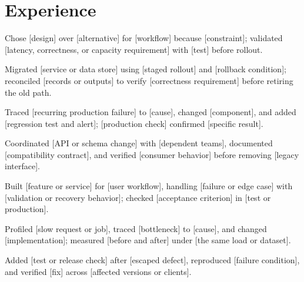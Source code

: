 \documentclass{resume}
\begin{document}

\section{Experience}

\begin{jobduties}
  \item Chose [design] over [alternative] for [workflow] because [constraint]; validated [latency, correctness, or capacity requirement] with [test] before rollout.
  \item Migrated [service or data store] using [staged rollout] and [rollback condition]; reconciled [records or outputs] to verify [correctness requirement] before retiring the old path.
  \item Traced [recurring production failure] to [cause], changed [component], and added [regression test and alert]; [production check] confirmed [specific result].
  \item Coordinated [API or schema change] with [dependent teams], documented [compatibility contract], and verified [consumer behavior] before removing [legacy interface].
\end{jobduties}

\begin{jobduties}
  \item Built [feature or service] for [user workflow], handling [failure or edge case] with [validation or recovery behavior]; checked [acceptance criterion] in [test or production].
  \item Profiled [slow request or job], traced [bottleneck] to [cause], and changed [implementation]; measured [before and after] under [the same load or dataset].
  \item Added [test or release check] after [escaped defect], reproduced [failure condition], and verified [fix] across [affected versions or clients].
\end{jobduties}
\end{document}
